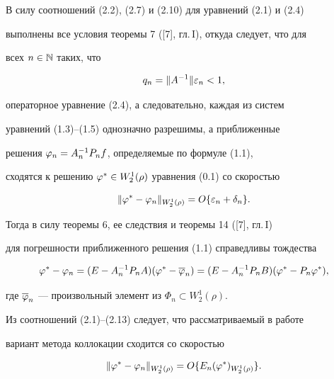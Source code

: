 В силу соотношений (2.2), (2.7) и (2.10) для уравнений (2.1) и (2.4) 


выполнены все условия теоремы 7 ([7], гл.\,I), откуда следует, что для 


всех $n\in \Bbb N$ таких, что 


\begin{equation}


q_n = \|A^{-1}\|\ve_n <1,


\end{equation}


операторное уравнение (2.4), а следовательно, каждая из систем 


уравнений (1.3)--(1.5) однозначно разрешимы, а приближенные 


решения $\varphi_n = A_n^{-1}P_nf$, определяемые по формуле (1.1), 


сходятся к решению $\varphi^*\in W_2^1(\rho)$ уравнения (0.1) со скоростью


\begin{equation}


\|\vp^*-\vp_n\|_{W_2^1(\rho)} = O\{\ve_n + \delta_n\}.


\end{equation}


Тогда в силу теоремы 6, ее следствия и теоремы 14 ([7], гл.\,I) 


для погрешности приближенного решения (1.1) справедливы тождества


\begin{equation}


\vp^* - \vp_n = (E - A_n^{-1}P_nA)(\vp^* - \ol{\vp}_n) =


(E - A_n^{-1}P_nB)(\vp^* - P_n\vp^*),


\end{equation}


где $\overline{\varphi}_n$ --- произвольный элемент из $\Phi_n \subset W_2^1(\rho)$.





Из соотношений (2.1)--(2.13) следует, что рассматриваемый в работе 


вариант метода коллокации сходится со скоростью 


\begin{equation}


\|\vp^* - \vp_n\|_{W_2^1(\rho)} = O \{


E_n(\vp^*)_{W_2^1(\rho)}\}.


\end{equation}


